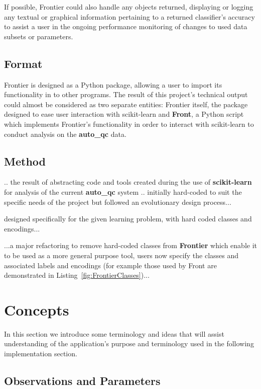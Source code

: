 If possible, Frontier could also handle any objects returned, displaying or
logging any textual or graphical information pertaining to a returned
classifier's accuracy to assist a user in the ongoing performance monitoring of
changes to used data subsets or parameters.


\subsection{Format}

Frontier is designed as a Python package, allowing a user to import its
functionality in to other programs. The result of this project's technical
output could almost be considered as two separate entities: Frontier itself, the
package designed to ease user interaction with scikit-learn and \textbf{Front},
a Python script which implements Frontier's functionality in order to interact
with scikit-learn to conduct analysis on the \textbf{auto\_qc} data.


\subsection{Method}

.. the result of abstracting code and tools created during the use of
\textbf{scikit-learn} for analysis of the current \textbf{auto\_qc} system
.. initially hard-coded to suit the specific needs of the project but followed
an evolutionary design process...

designed specifically for the given learning problem, with hard coded
classes and encodings...

...a major refactoring to remove hard-coded classes from \textbf{Frontier} which
enable it to be used as a more general purpose tool, users now specify the
classes and associated labels and encodings (for example those used by Front are
demonstrated in Listing~\ref{fig:FrontierClasses})...


\section{Concepts}

In this section we introduce some terminology and ideas that will assist
understanding of the application's purpose and terminology used in the following
implementation section.


\subsection{Observations and Parameters}

